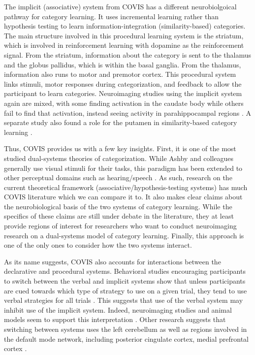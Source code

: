 \documentclass[../dissertation.tex]{subfiles}
\begin{document}
	The implicit (associative) system from COVIS has a different neurobiolgoical pathway for category learning. It uses incremental learning rather than hypothesis testing to learn information-integration (similarity-based) categories. The main structure involved in this procedural learning system is the striatum, which is involved in reinforcement learning with dopamine as the reinforcement signal. From the striatum, information about the category is sent to the thalamus and the globus pallidus, which is within the basal ganglia. From the thalamus, information also runs to motor and premotor cortex. This procedural system links stimuli, motor responses during categorization, and feedback to allow the participant to learn categories. Neuroimaging studies using the implicit system again are mixed, with some finding activation in the caudate body while others fail to find that activation, instead seeing activity in parahippocampal regions \citep{Nomura2007,Carpenter2016}. A separate study also found a role for the putamen in similarity-based category learning \citep{Waldschmidt2011}. \par
	Thus, COVIS provides us with a few key insights. First, it is one of the most studied dual-systems theories of categorization. While Ashby and colleagues generally use visual stimuli for their tasks, this paradigm has been extended to other perceptual domains such as hearing/speech \citep{Chandrasekaran2014, Chandrasekaran2016}. As such, research on the current theoretical framework (associative/hypothesis-testing systems) has much COVIS literature which we can compare it to. It also makes clear claims about the neurobiological basis of the two systems of category learning. While the specifics of these claims are still under debate in the literature, they at least provide regions of interest for researchers who want to conduct neuroimaging research on a dual-systems model of category learning. Finally, this approach is one of the only ones to consider how the two systems interact. \par
	As its name suggests, COVIS also accounts for interactions between the declarative and procedural systems. Behavioral studies encouraging participants to switch between the verbal and implicit systems show that unless participants are cued towards which type of strategy to use on a given trial, they tend to use verbal strategies for all trials \citep{Ashby2010, Erickson2008}. This suggests that use of the verbal system may inhibit use of the implicit system. Indeed, neuroimaging studies and animal models seem to support this interpretation \citep{Foerde2006, Packard1996}. Other research suggests that switching between systems uses the left cerebellum as well as regions involved in the default mode network, including posterior cingulate cortex, medial prefrontal cortex \citep{Turner2017}.
	
\end{document}
